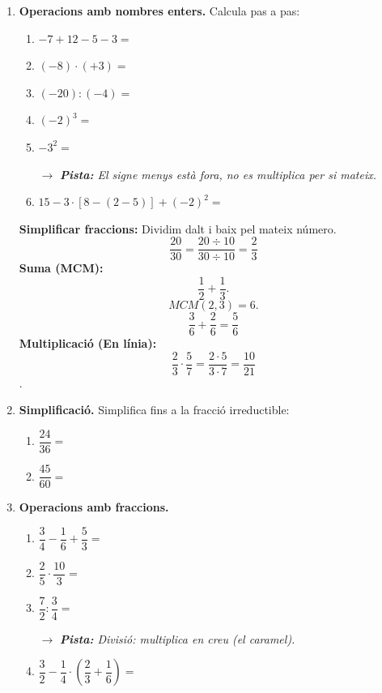 \documentclass[12pt,a4paper]{article}
\newcommand{\pista}[1]{
    \par\vspace{2pt}
    {\small \color{blue!70!black} $\rightarrow$ \textit{\textbf{Pista:} #1}}
}
\begin{document}
\begin{enumerate}
    \item \textbf{Operacions amb nombres enters.} Calcula pas a pas:
    \begin{enumerate}
        \item $-7 + 12 - 5 - 3 =$
        \item $(-8) \cdot (+3) =$
        \item $(-20) : (-4) =$
        \item $(-2)^3 =$ 
        \item $-3^2 =$ \pista{El signe menys està fora, no es multiplica per si mateix.}
        \item $15 - 3 \cdot [ 8 - (2 - 5) ] + (-2)^2 =$
    \end{enumerate}

\newpage
\begin{exemple}
\textbf{Simplificar fraccions:} Dividim dalt i baix pel mateix número.
$$ \dfrac{20}{30} = \dfrac{20 \div 10}{30 \div 10} = \dfrac{2}{3} $$ 
\textbf{Suma (MCM):} $$\frac{1}{2} + \frac{1}{3}.$$ $$ MCM(2,3)=6. $$  $$\frac{3}{6} + \frac{2}{6} = \frac{5}{6}$$
\textbf{Multiplicació (En línia):} $$\frac{2}{3} \cdot \frac{5}{7} = \frac{2\cdot5}{3\cdot7} = \frac{10}{21}$$.
\end{exemple}

    \item \textbf{Simplificació.} Simplifica fins a la fracció irreductible:
    \begin{enumerate}
        \item $\dfrac{24}{36} =$
        \item $\dfrac{45}{60} =$
    \end{enumerate}

    \item \textbf{Operacions amb fraccions.} 
    \begin{enumerate}
        \item $\dfrac{3}{4} - \dfrac{1}{6} + \dfrac{5}{3} =$ \vspace{0.2cm}
        \item $\dfrac{2}{5} \cdot \dfrac{10}{3} =$ \vspace{0.2cm}
        \item $\dfrac{7}{2} : \dfrac{3}{4} =$ \pista{Divisió: multiplica en creu (el caramel).} \vspace{0.2cm}
        \item $\dfrac{3}{2} - \dfrac{1}{4} \cdot \left( \dfrac{2}{3} + \dfrac{1}{6} \right) =$ 
    \end{enumerate}
\end{enumerate}
\end{document}
